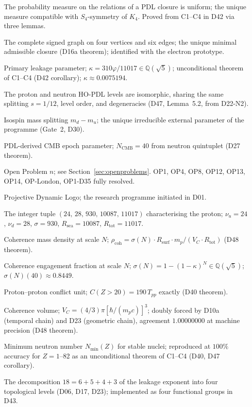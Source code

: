 \documentclass[11pt,a4paper]{article}
\theoremstyle{plain}
\theoremstyle{definition}
\theoremstyle{remark}
\newcommand{\quintuplet}{(24,\,28,\,930,\,10087,\,11017)}
\newcommand{\Rsurf}{R_{\mathrm{surf}}}
\newcommand{\Rtot}{R_{\mathrm{tot}}}
\newcommand{\sigmaN}{\sigma(N)}
\newcommand{\Tpp}{T_{pp}}
\newcommand{\rhocoh}{\rho_{\mathrm{coh}}}
\begin{document}
\begin{description}[leftmargin=3.5cm, style=nextline]
\item[Indifference Lemma (H3)] The probability measure on the relations of a PDL closure is uniform; the unique measure compatible with $S_4$-symmetry of $K_4$. Proved from C1--C4 in D42 via three lemmas.
\item[$K_4$] The complete signed graph on four vertices and six edges; the unique minimal admissible closure (D16a theorem); identified with the electron prototype.
\item[$\kappa$] Primary leakage parameter; $\kappa=310\varphi/11017\in\mathbb{Q}(\sqrt{5})$; unconditional theorem of C1--C4 (D42 corollary); $\kappa\approx 0.0075194$.
\item[Mirror Lemma] The proton and neutron HO-PDL levels are isomorphic, sharing the same splitting $s=1/12$, level order, and degeneracies (D47, Lemma~5.2, from D22-N2).
\item[$m_{\mathrm{iso}}$] Isospin mass splitting $m_d-m_u$; the unique irreducible external parameter of the programme (Gate~2, D30).
\item[$N_{\mathrm{CMB}}$] PDL-derived CMB epoch parameter; $N_{\mathrm{CMB}}=40$ from neutron quintuplet (D27 theorem).
\item[OP$n$] Open Problem $n$; see Section~\ref{sec:openproblems}. OP1, OP4, OP8, OP12, OP13, OP14, OP-London, OP1-D35 fully resolved.
\item[PDL] Projective Dynamic Logo; the research programme initiated in D01.
\item[Quintuplet] The integer tuple $\quintuplet$ characterising the proton; $\nu_u=24$, $\nu_d=28$, $\sigma=930$, $R_{\mathrm{sea}}=10087$, $R_{\mathrm{tot}}=11017$.
\item[$\rhocoh(N)$] Coherence mass density at scale $N$; $\rhocoh = \sigmaN\cdot\Rsurf\cdot m_p/(V_C\cdot\Rtot)$ (D48 theorem).
\item[$\sigmaN(N)$] Coherence engagement fraction at scale $N$; $\sigmaN=1-(1-\kappa)^N\in\mathbb{Q}(\sqrt{5})$; $\sigmaN(40)\approx 0.8449$.
\item[$\Tpp$] Proton--proton conflict unit; $C(Z>20)=190\,\Tpp$ exactly (D40 theorem).
\item[$V_C$] Coherence volume; $V_C=(4/3)\pi[\hbar/(m_pc)]^3$; doubly forced by D10a (temporal chain) and D23 (geometric chain), agreement $1.00000000$ at machine precision (D48 theorem).
\item[Valley of stability] Minimum neutron number $N_{\min}(Z)$ for stable nuclei; reproduced at $100\%$ accuracy for $Z=1$--82 as an unconditional theorem of C1--C4 (D40, D47 corollary).
\item[18-filter hierarchy] The decomposition $18=6+5+4+3$ of the leakage exponent into four topological levels (D06, D17, D23); implemented as four functional groups in D43.
\end{description}

\clearpage



\end{document}
